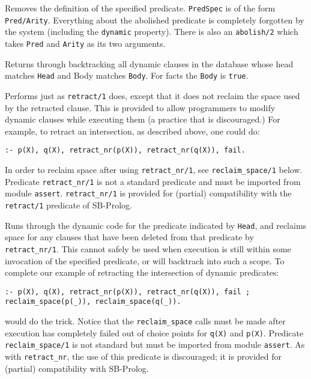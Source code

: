 \begin{description}
Removes the definition of the specified predicate.  {\tt PredSpec}
is of the form {\tt Pred/Arity}.  Everything about the abolished
predicate is completely forgotten by the system (including the
{\tt dynamic} property).  There is also an {\tt abolish/2} which
takes {\tt Pred} and {\tt Arity} as its two arguments.

Returns through backtracking all dynamic clauses in the database whose head
matches {\tt Head} and Body matches {\tt Body}.  For facts the {\tt Body} is
{\tt true}.  

Performs just as {\tt retract/1} does, except that it does not reclaim the
space used by the retracted clause. This is provided to allow programmers
to modify dynamic clauses while executing them (a practice that is 
discouraged.) For example, to retract an intersection, as described above,
one could do:
\begin{center}
{\tt :- p(X), q(X), retract\_nr(p(X)), retract\_nr(q(X)), fail.}
\end{center}
In order to reclaim space after using {\tt retract\_nr/1}, see 
{\tt reclaim\_space/1} below.  Predicate {\tt retract\_nr/1}
is not a standard predicate and must be imported from module {\tt assert}.
{\tt retract\_nr/1} is provided for (partial)
compatibility with the {\tt retract/1} predicate of SB-Prolog.


Runs through the dynamic code for the predicate indicated by {\tt Head}, and
reclaims space for any clauses that have been deleted from that predicate by
{\tt retract\_nr/1}.  This cannot safely be used when execution is still
within some invocation of the specified predicate, or will backtrack into
such a scope.  To complete our example of retracting the intersection of
dynamic predicates:
\begin{center}
{\tt :- p(X), q(X), retract\_nr(p(X)), retract\_nr(q(X)), fail\ ;\\
     reclaim\_space(p(\_)), reclaim\_space(q(\_)).}
\end{center}
would do the trick. Notice that the {\tt reclaim\_space} calls 
must be made after execution has completely failed
out of choice points for {\tt q(X)} and {\tt p(X)}.  Predicate 
{\tt reclaim\_space/1} is not
standard but must be imported from module {\tt assert}.
As with {\tt retract\_nr}, the use of this predicate is discouraged; 
it is provided for (partial) compatibility with SB-Prolog.


\end{description}
